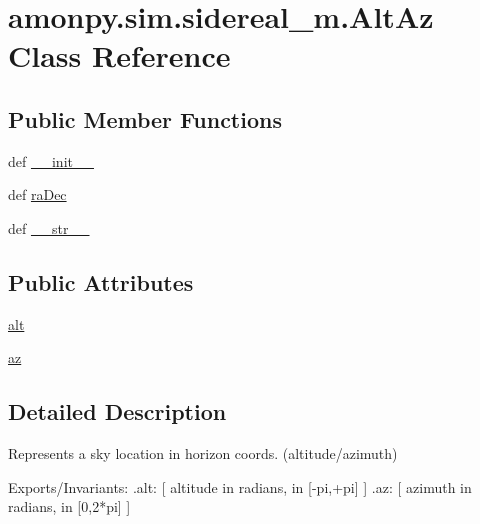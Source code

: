 \hypertarget{classamonpy_1_1sim_1_1sidereal__m_1_1_alt_az}{\section{amonpy.\-sim.\-sidereal\-\_\-m.\-Alt\-Az Class Reference}
\label{classamonpy_1_1sim_1_1sidereal__m_1_1_alt_az}
}
\subsection*{Public Member Functions}
\begin{DoxyCompactItemize}
\item 
def \hyperlink{classamonpy_1_1sim_1_1sidereal__m_1_1_alt_az_a67a6214cfaf80bbc6430f369cdb63a2b}{\-\_\-\-\_\-init\-\_\-\-\_\-}
\item 
def \hyperlink{classamonpy_1_1sim_1_1sidereal__m_1_1_alt_az_a5c119d0011e0e44ac11e924f21dc652d}{ra\-Dec}
\item 
def \hyperlink{classamonpy_1_1sim_1_1sidereal__m_1_1_alt_az_a40aadadac18ad5011e8818dc82b23e4c}{\-\_\-\-\_\-str\-\_\-\-\_\-}
\end{DoxyCompactItemize}
\subsection*{Public Attributes}
\begin{DoxyCompactItemize}
\item 
\hyperlink{classamonpy_1_1sim_1_1sidereal__m_1_1_alt_az_aa0ff247b310a833a5391c0b09f939d3b}{alt}
\item 
\hyperlink{classamonpy_1_1sim_1_1sidereal__m_1_1_alt_az_ab076f42a7d43bb00902e111c345e43c0}{az}
\end{DoxyCompactItemize}


\subsection{Detailed Description}
\begin{DoxyVerb}Represents a sky location in horizon coords. (altitude/azimuth)

  Exports/Invariants:
    .alt:   [ altitude in radians, in [-pi,+pi] ]
    .az:    [ azimuth in radians, in [0,2*pi] ]
\end{DoxyVerb}
 

